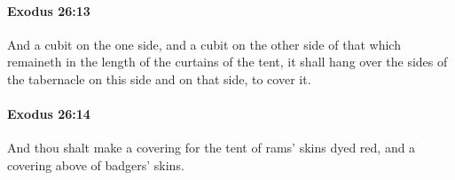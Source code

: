 		\paragraph{Exodus 26:13} %
			\label{EXODUS-26-13}

			And a cubit on the one side, and a cubit on the other side of that which remaineth in the length of the curtains of the tent, it shall hang over the sides of the tabernacle on this side and on that side, to cover it.


		\paragraph{Exodus 26:14} %
			\label{EXODUS-26-14}

			And thou shalt make a covering for the tent of rams' skins dyed red, and a covering above of badgers' skins.


